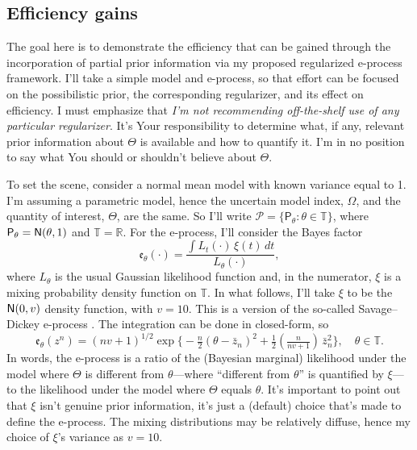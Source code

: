 \documentclass[a4paper, 12pt]{article}
\theoremstyle{plain}
\theoremstyle{definition}
\theoremstyle{remark}
\newcommand{\prob}{\mathsf{P}}
\newcommand{\nm}{{\sf N}}
\newcommand{\RR}{\mathbb{R}}
\newcommand{\TT}{\mathbb{T}}
\newcommand{\model}{\mathscr{P}}
\newcommand{\eval}{\mathfrak{e}}
\begin{document}
\subsection{Efficiency gains}
\label{SS:gains}

The goal here is to demonstrate the efficiency that can be gained through the incorporation of partial prior information via my proposed regularized e-process framework.  I'll take a simple model and e-process, so that effort can be focused on the possibilistic prior, the corresponding regularizer, and its effect on efficiency.  I must emphasize that {\em I'm not recommending off-the-shelf use of any particular regularizer}.  It's Your responsibility to determine what, if any, relevant prior information about $\Theta$ is available and how to quantify it.  I'm in no position to say what You should or shouldn't believe about $\Theta$.  

To set the scene, consider a normal mean model with known variance equal to 1.  I'm assuming a parametric model, hence the uncertain model index, $\Omega$, and the quantity of interest, $\Theta$, are the same.  So I'll write $\model = \{ \prob_\theta: \theta \in \TT\}$, where $\prob_\theta = \nm(\theta, 1)$ and $\TT = \RR$.  For the e-process, I'll consider the Bayes factor
\[ \eval_\theta(\cdot) = \frac{\int L_t(\cdot) \, \xi(t) \, dt}{L_\theta(\cdot)}, \]
where $L_\theta$ is the usual Gaussian likelihood function and, in the numerator, $\xi$ is a mixing probability density function on $\TT$.  In what follows, I'll take $\xi$ to be the $\nm(0, v)$ density function, with $v=10$.  This is a version of the so-called Savage--Dickey e-process \citep[e.g.,][]{grunwald.epost}.  The integration can be done in closed-form, so
\[ \eval_\theta(z^n) = (nv + 1)^{1/2} \exp\bigl\{ -\tfrac{n}{2} (\theta - \bar z_n)^2 + \tfrac12 ( \tfrac{n}{nv + 1} ) \, \bar z_n^2 \bigr\}, \quad \theta \in \TT. \]
In words, the e-process is a ratio of the (Bayesian marginal) likelihood under the model where $\Theta$ is different from $\theta$---where ``different from $\theta$'' is quantified by $\xi$---to the likelihood under the model where $\Theta$ equals $\theta$.  It's important to point out that $\xi$ isn't genuine prior information, it's just a (default) choice that's made to define the e-process.  
The mixing distributions may be relatively diffuse, hence my choice of $\xi$'s variance as $v=10$.  
\end{document}
